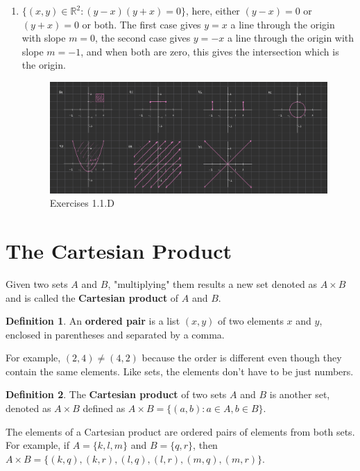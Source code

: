\documentclass[10pt]{article}
\newcommand{\R}{\mathbb{R}}
\theoremstyle{definition}
\newtheorem{definition}{Definition}
\begin{document}
\begin{enumerate}[label=\Alph*.]
\begin{enumerate}[label=\arabic*.]
            \item $\{(x,y)\in\R^2:(y-x)(y+x)=0\}$, here, either $(y-x)=0$ or $(y+x)=0$ or both. The first case gives $y=x$ a line through the origin with slope $m=0$, the second case gives $y=-x$ a line through the origin with slope $m=-1$, and when both are zero, this gives the intersection which is the origin.
                \begin{figure}
                    \centering
                    \includegraphics[width=0.75\linewidth]{images/exercise_1_1_D.jpg}
                    \caption{Exercises 1.1.D}
                \end{figure}
        \end{enumerate}
\end{enumerate}

\section{The Cartesian Product}

Given two sets $A$ and $B$, "multiplying" them results a new set denoted as $A\times B$ and is called the \textbf{Cartesian product} of $A$ and $B$.

\begin{definition}
    An \textbf{ordered pair} is a list $(x,y)$ of two elements $x$ and $y$, enclosed in parentheses and separated by a comma.
\end{definition}

For example, $(2,4) \neq (4,2)$ because the order is different even though they contain the same elements. Like sets, the elements don't have to be just numbers.

\begin{definition}
    The \textbf{Cartesian product} of two sets $A$ and $B$ is another set, denoted as $A\times B$ defined as $A \times B = \{ (a,b) : a\in A, b\in B\}$.
\end{definition}

The elements of a Cartesian product are ordered pairs of elements from both sets. For example, if $A = \{k,l,m\}$ and $B = \{q,r\}$, then $A \times B = \{(k,q),(k,r),(l,q),(l,r),(m,q),(m,r)\}$.
\end{document}
